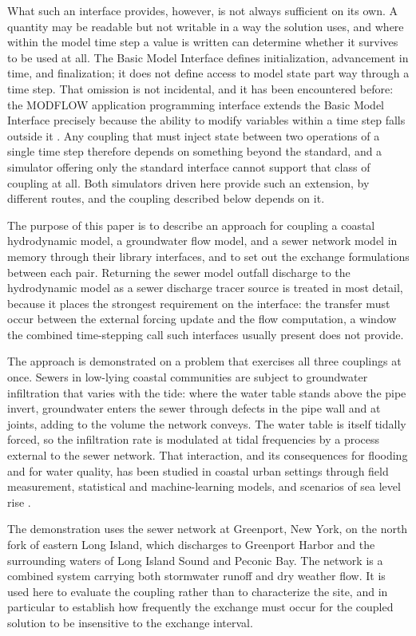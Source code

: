 \documentclass[preprint,authoryear,11pt]{elsarticle}
\begin{document}
What such an interface provides, however, is not always sufficient on its own. A quantity may be readable but not writable in a way the solution uses, and where within the model time step a value is written can determine whether it survives to be used at all. The Basic Model Interface defines initialization, advancement in time, and finalization; it does not define access to model state part way through a time step. That omission is not incidental, and it has been encountered before: the MODFLOW application programming interface extends the Basic Model Interface precisely because the ability to modify variables within a time step falls outside it \citep{hughes2022modflowapi}. Any coupling that must inject state between two operations of a single time step therefore depends on something beyond the standard, and a simulator offering only the standard interface cannot support that class of coupling at all. Both simulators driven here provide such an extension, by different routes, and the coupling described below depends on it.

The purpose of this paper is to describe an approach for coupling a coastal hydrodynamic model, a groundwater flow model, and a sewer network model in memory through their library interfaces, and to set out the exchange formulations between each pair. Returning the sewer model outfall discharge to the hydrodynamic model as a sewer discharge tracer source is treated in most detail, because it places the strongest requirement on the interface: the transfer must occur between the external forcing update and the flow computation, a window the combined time-stepping call such interfaces usually present does not provide.

The approach is demonstrated on a problem that exercises all three couplings at once. Sewers in low-lying coastal communities are subject to groundwater infiltration that varies with the tide: where the water table stands above the pipe invert, groundwater enters the sewer through defects in the pipe wall and at joints, adding to the volume the network conveys. The water table is itself tidally forced, so the infiltration rate is modulated at tidal frequencies by a process external to the sewer network. That interaction, and its consequences for flooding and for water quality, has been studied in coastal urban settings through field measurement, statistical and machine-learning models, and scenarios of sea level rise \citep{liu2018gwsewer, su2019infiltration, liu2021predicting, su2022slr}.

The demonstration uses the sewer network at Greenport, New York, on the north fork of eastern Long Island, which discharges to Greenport Harbor and the surrounding waters of Long Island Sound and Peconic Bay. The network is a combined system carrying both stormwater runoff and dry weather flow. It is used here to evaluate the coupling rather than to characterize the site, and in particular to establish how frequently the exchange must occur for the coupled solution to be insensitive to the exchange interval.
\end{document}
